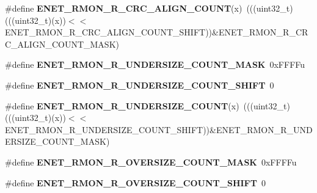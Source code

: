 \begin{DoxyCompactItemize}
\item 
\#define {\bfseries E\+N\+E\+T\+\_\+\+R\+M\+O\+N\+\_\+\+R\+\_\+\+C\+R\+C\+\_\+\+A\+L\+I\+G\+N\+\_\+\+C\+O\+U\+NT}(x)~(((uint32\+\_\+t)(((uint32\+\_\+t)(x))$<$$<$E\+N\+E\+T\+\_\+\+R\+M\+O\+N\+\_\+\+R\+\_\+\+C\+R\+C\+\_\+\+A\+L\+I\+G\+N\+\_\+\+C\+O\+U\+N\+T\+\_\+\+S\+H\+I\+FT))\&E\+N\+E\+T\+\_\+\+R\+M\+O\+N\+\_\+\+R\+\_\+\+C\+R\+C\+\_\+\+A\+L\+I\+G\+N\+\_\+\+C\+O\+U\+N\+T\+\_\+\+M\+A\+SK)\hypertarget{group__ENET__Register__Masks_ga7ae15afbb7439b8f9879f90331f3679e}{}\label{group__ENET__Register__Masks_ga7ae15afbb7439b8f9879f90331f3679e}

\item 
\#define {\bfseries E\+N\+E\+T\+\_\+\+R\+M\+O\+N\+\_\+\+R\+\_\+\+U\+N\+D\+E\+R\+S\+I\+Z\+E\+\_\+\+C\+O\+U\+N\+T\+\_\+\+M\+A\+SK}~0x\+F\+F\+F\+Fu\hypertarget{group__ENET__Register__Masks_ga8a24b45ac31e9bb082d18e378e634dad}{}\label{group__ENET__Register__Masks_ga8a24b45ac31e9bb082d18e378e634dad}

\item 
\#define {\bfseries E\+N\+E\+T\+\_\+\+R\+M\+O\+N\+\_\+\+R\+\_\+\+U\+N\+D\+E\+R\+S\+I\+Z\+E\+\_\+\+C\+O\+U\+N\+T\+\_\+\+S\+H\+I\+FT}~0\hypertarget{group__ENET__Register__Masks_gaea02d213bcae36ffe06ff62931d8af0d}{}\label{group__ENET__Register__Masks_gaea02d213bcae36ffe06ff62931d8af0d}

\item 
\#define {\bfseries E\+N\+E\+T\+\_\+\+R\+M\+O\+N\+\_\+\+R\+\_\+\+U\+N\+D\+E\+R\+S\+I\+Z\+E\+\_\+\+C\+O\+U\+NT}(x)~(((uint32\+\_\+t)(((uint32\+\_\+t)(x))$<$$<$E\+N\+E\+T\+\_\+\+R\+M\+O\+N\+\_\+\+R\+\_\+\+U\+N\+D\+E\+R\+S\+I\+Z\+E\+\_\+\+C\+O\+U\+N\+T\+\_\+\+S\+H\+I\+FT))\&E\+N\+E\+T\+\_\+\+R\+M\+O\+N\+\_\+\+R\+\_\+\+U\+N\+D\+E\+R\+S\+I\+Z\+E\+\_\+\+C\+O\+U\+N\+T\+\_\+\+M\+A\+SK)\hypertarget{group__ENET__Register__Masks_gaa7cdec7b69c65dc05143f3f864e6bbc4}{}\label{group__ENET__Register__Masks_gaa7cdec7b69c65dc05143f3f864e6bbc4}

\item 
\#define {\bfseries E\+N\+E\+T\+\_\+\+R\+M\+O\+N\+\_\+\+R\+\_\+\+O\+V\+E\+R\+S\+I\+Z\+E\+\_\+\+C\+O\+U\+N\+T\+\_\+\+M\+A\+SK}~0x\+F\+F\+F\+Fu\hypertarget{group__ENET__Register__Masks_ga3d8f160025d5d600fd7206e6fc762fc1}{}\label{group__ENET__Register__Masks_ga3d8f160025d5d600fd7206e6fc762fc1}

\item 
\#define {\bfseries E\+N\+E\+T\+\_\+\+R\+M\+O\+N\+\_\+\+R\+\_\+\+O\+V\+E\+R\+S\+I\+Z\+E\+\_\+\+C\+O\+U\+N\+T\+\_\+\+S\+H\+I\+FT}~0\hypertarget{group__ENET__Register__Masks_ga3e279c65a9e7d91eef6b4f228c028f47}{}\label{group__ENET__Register__Masks_ga3e279c65a9e7d91eef6b4f228c028f47}


\end{DoxyCompactItemize}
